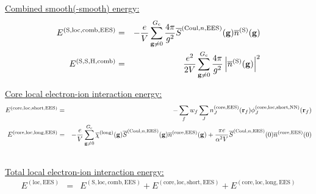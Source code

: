 \documentclass[paper=a4, fontsize=11pt]{article} %
\numberwithin{equation}{section} %
\numberwithin{figure}{section} %
\numberwithin{table}{section} %
\newcommand{\ol}{\overline}
\newcommand{\bg}{{\bf{g}}}
\newcommand{\br}{{\bf{r}}}
\newcommand{\rS}{{\mathrm{S}}}
\newcommand{\rEES}{{\mathrm{EES}}}
\newcommand{\rcore}{{\mathrm{core}}}
\newcommand{\rNN}{{\mathrm{NN}}}
\newcommand{\rCo}{{\mathrm{Coul}}}
\newcommand{\rshort}{{\mathrm{short}}}
\newcommand{\rlong}{{\mathrm{long}}}
\newcommand{\rH}{{\mathrm{H}}}
\newcommand{\rcomb}{{\mathrm{comb}}}
\newcommand{\rlo}{{\mathrm{loc}}}
\newcommand{\Gc}{{G_{\mathrm{c}}}}
\begin{document}
\underline{Combined smooth(-smooth) energy:}
\begin{eqnarray}
E^{(\rS,\rlo,\rcomb,\rEES)}
&=& -\frac{e}{V}\sum_{\bg \neq 0}^\Gc \frac{4\pi}{g^2} \ol S^{(\rCo,n,\rEES)}(\bg)\overline{n}^{(\rS)}(\bg)\\ 
E^{(\rS,\rS,\rH,\rcomb)} &=& \frac{e^2}{2V} \sum_{\bg \neq 0}^\Gc \frac{4\pi}{g^2}\left|\ol{n}^{(\rS)}(\bg)\right|^2 
\end{eqnarray}


\underline{Core local electron-ion interaction energy:}
\begin{eqnarray}
E^{(\rcore,\rlo,\rshort,\rEES)}
&=& - \sum_f w_f \sum_J n_J^{(\rcore,\rEES)}(\br_f)\phi_J^{(\rcore,\rlo,\rshort,\rNN)}(\br_f) \\
E^{(\rcore,\rlo,\rlong,\rEES)}&=& - \frac{e}{V} \sum_{\bg \neq 0}^{\Gc} \ol \chi^{(\rlong)}(\bg)  \ol S^{(\rCo,n,\rEES)}(\bg) \ol n^{(\rcore,\rEES)}(\bg)+ \frac{\pi e}{\alpha^2 V} \ol S^{(\rCo,n,\rEES)}(0) \ol n^{(\rcore,\rEES)}(0)\nonumber\\
&\ &
\end{eqnarray}

\underline{Total local electron-ion interaction energy:}
\begin{eqnarray}
E^{(\rlo,\rEES)}
&=& E^{(\rS,\rlo,\rcomb,\rEES)}+E^{(\rcore,\rlo,\rshort,\rEES)}+E^{(\rcore,\rlo,\rlong,\rEES)}
\end{eqnarray}
\end{document}
